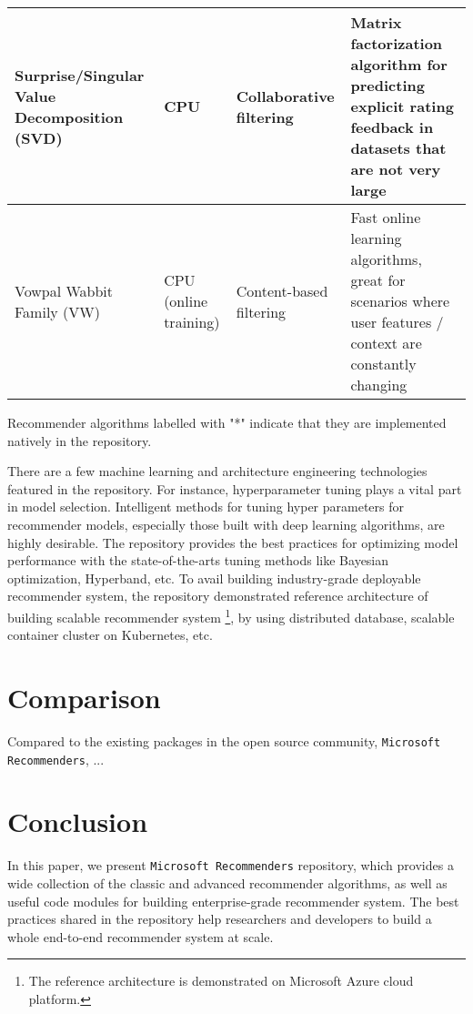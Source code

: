 \documentclass[twoside,11pt]{article}
\begin{document}
\begin{adjustbox}{angle=90}
\begin{threeparttable}
\begin{tabular}{|p{5cm}|p{2cm}|p{4cm}|p{6cm}|}
    \hline
    Surprise/Singular Value Decomposition (SVD) & CPU & Collaborative filtering & Matrix factorization algorithm for predicting explicit rating feedback in datasets that are not very large \\
    \hline
    Vowpal Wabbit Family (VW) & CPU (online training) & Content-based filtering & Fast online learning algorithms, great for scenarios where user features / context are constantly changing \\
    \hline
    \end{tabular}
    \begin{tablenotes}
      \scriptsize
      \item Recommender algorithms labelled with "*" indicate that they are implemented natively in the repository.
    \end{tablenotes}
  \end{threeparttable}
\end{adjustbox}

There are a few machine learning and architecture engineering technologies featured in the repository. For instance, hyperparameter tuning plays a vital part in model selection. Intelligent methods for tuning hyper parameters for recommender models, especially those built with deep learning algorithms, are highly desirable. The repository provides the best practices for optimizing model performance with the state-of-the-arts tuning methods like Bayesian optimization, Hyperband, etc. \citep{pelikan1999boa,li2016hyperband} To avail building industry-grade deployable recommender system, the repository demonstrated reference architecture of building scalable recommender system \footnote{The reference architecture is demonstrated on Microsoft Azure cloud platform.}, by using distributed database, scalable container cluster on Kubernetes, etc.

\section{Comparison}
Compared to the existing packages in the open source community, \verb|Microsoft Recommenders|, ...  

\section{Conclusion}
In this paper, we present \verb|Microsoft Recommenders| repository, which provides a wide collection of the classic and advanced recommender algorithms, as well as useful code modules for building enterprise-grade recommender system. The best practices shared in the repository help researchers and developers to build a whole end-to-end recommender system at scale.
\end{document}
